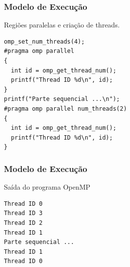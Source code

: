 \documentclass[xcolor={usenames,dvipsnames},12pt,presentation,aspectratio=169]{beamer}
\begin{document}
\begin{frame}[fragile]
  \frametitle{Modelo de Execução}
  Regiões paralelas e criação de threads.
  \begin{minipage}{0.95\textwidth}  
    \begin{verbatim}
omp_set_num_threads(4); 
#pragma omp parallel
{
  int id = omp_get_thread_num();
  printf("Thread ID %d\n", id);
}
printf("Parte sequencial ...\n");
#pragma omp parallel num_threads(2)
{
  int id = omp_get_thread_num();
  printf("Thread ID %d\n", id);
}
\end{verbatim}
\end{minipage}
\end{frame}
\begin{frame}[fragile]
  \frametitle{Modelo de Execução}
  \begin{block}{Saída do programa OpenMP}
\begin{verbatim}
Thread ID 0
Thread ID 3
Thread ID 2
Thread ID 1
Parte sequencial ...
Thread ID 1
Thread ID 0
\end{verbatim}
  \end{block}
\end{frame}

\end{document}

